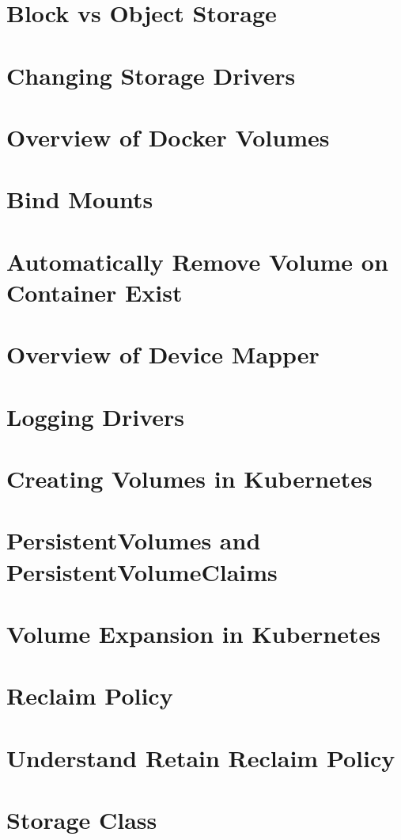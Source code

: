 \documentclass[11pt]{book}
\begin{document}
    \section{Block vs Object Storage}

    \section{Changing Storage Drivers}

    \section{Overview of Docker Volumes}


    \section{Bind Mounts}


    \section{Automatically Remove Volume on Container Exist}


    \section{Overview of Device Mapper}


    \section{Logging Drivers}


    \section{Creating Volumes in Kubernetes}


    \section{PersistentVolumes and PersistentVolumeClaims}


    \section{Volume Expansion in Kubernetes}


    \section{Reclaim Policy}


    \section{Understand Retain Reclaim Policy}


    \section{Storage Class}

\end{document}
